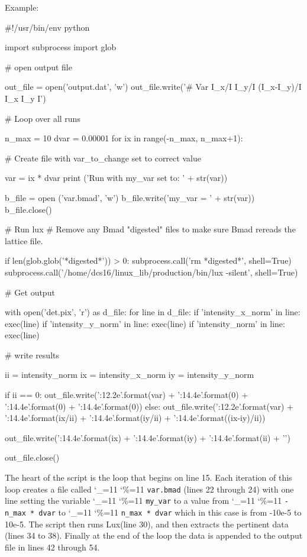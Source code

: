 \documentclass[11pt]{article}
\newcommand{\lux}{Lux\xspace}
\newcommand\ttcmd{\begingroup\catcode`\_=11 \catcode`\%=11 \dottcmd}
\newcommand\dottcmd[1]{\texttt{#1}\endgroup}
\newcommand{\vn}{\ttcmd}
\begin{document}
{{{{{{{{{{{{{{{Example:
\begin{listing}{1}
#!/usr/bin/env python

import subprocess
import glob

# open output file

out_file = open('output.dat', 'w')
out_file.write('#       Var         I_x/I         I_y/I   (I_x-I_y)/I           I_x           I_y             I\n')

# Loop over all runs

n_max = 10
dvar = 0.00001
for ix in range(-n_max, n_max+1):

  # Create file with var_to_change set to correct value

  var = ix * dvar
  print ('Run with my_var set to: ' + str(var))

  b_file = open ('var.bmad', 'w')
  b_file.write('my_var = ' + str(var))
  b_file.close()

  # Run lux
  # Remove any Bmad "digested" files to make sure Bmad rereads the lattice file.

  if len(glob.glob('*digested*')) > 0: subprocess.call('rm *digested*', shell=True)
  subprocess.call('/home/dcs16/linux_lib/production/bin/lux -silent', shell=True)

  # Get output

  with open('det.pix', 'r') as d_file:
    for line in d_file:
      if 'intensity_x_norm' in line: exec(line)
      if 'intensity_y_norm' in line: exec(line)
      if 'intensity_norm' in line: exec(line)

  # write results

  ii = intensity_norm
  ix = intensity_x_norm
  iy = intensity_y_norm

  if ii == 0:
    out_file.write('{:12.2e}'.format(var) + '{:14.4e}'.format(0) + 
                   '{:14.4e}'.format(0) + '{:14.4e}'.format(0))
  else:
    out_file.write('{:12.2e}'.format(var) + '{:14.4e}'.format(ix/ii) + 
                   '{:14.4e}'.format(iy/ii) + '{:14.4e}'.format((ix-iy)/ii))

  out_file.write('{:14.4e}'.format(ix) + '{:14.4e}'.format(iy) + 
                 '{:14.4e}'.format(ii) + '\n')

out_file.close()
\end{listing}

The heart of the script is the loop that begins on line 15. Each iteration of this loop creates a
file called \vn{var.bmad} (lines 22 through 24) with one line setting the variable \vn{my_var} to a
value from \vn{-n_max * dvar} to \vn{n_max * dvar} which in this case is from -10e-5 to 10e-5. The
script then runs \lux (line 30), and then extracts the pertinent data (lines 34 to 38). Finally at
the end of the loop the data is appended to the output file in lines 42 through 54.

}}}}}}}}}}}}}}}
\end{document}
